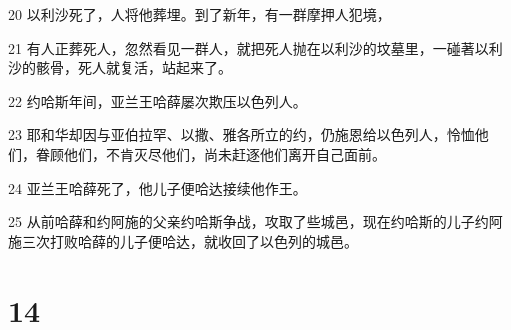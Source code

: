 \par 20 以利沙死了，人将他葬埋。到了新年，有一群摩押人犯境，
\par 21 有人正葬死人，忽然看见一群人，就把死人抛在以利沙的坟墓里，一碰著以利沙的骸骨，死人就复活，站起来了。
\par 22 约哈斯年间，亚兰王哈薛屡次欺压以色列人。
\par 23 耶和华却因与亚伯拉罕、以撒、雅各所立的约，仍施恩给以色列人，怜恤他们，眷顾他们，不肯灭尽他们，尚未赶逐他们离开自己面前。
\par 24 亚兰王哈薛死了，他儿子便哈达接续他作王。
\par 25 从前哈薛和约阿施的父亲约哈斯争战，攻取了些城邑，现在约哈斯的儿子约阿施三次打败哈薛的儿子便哈达，就收回了以色列的城邑。

\chapter{14}

